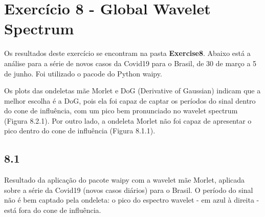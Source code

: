 
\section*{\large Exercício 8 - Global Wavelet Spectrum}
%

Os resultados deste exercício se encontram na pasta \textbf{Exercise8}. Abaixo está a análise para a série de novos casos da Covid19 para o Brasil, de 30 de março a 5 de junho. Foi utilizado o pacode do Python waipy.

Os plots das ondeletas mãe Morlet e DoG (Derivative of Gaussian) indicam que a melhor escolha é a DoG, pois ela foi capaz de captar os períodos do sinal dentro do cone de influência, com um pico bem pronunciado no wavelet spectrum (Figura 8.2.1). Por outro lado, a ondeleta Morlet não foi capaz de apresentar o pico dentro do cone de influência (Figura 8.1.1).

\subsection*{8.1}
%

Resultado da aplicação do pacote waipy com a wavelet mãe Morlet, aplicada sobre a série da Covid19 (novos casos diários) para o Brasil. O período do sinal não é bem captado pela ondeleta: o pico do espectro wavelet - em azul à direita - está fora do cone de influência. 

